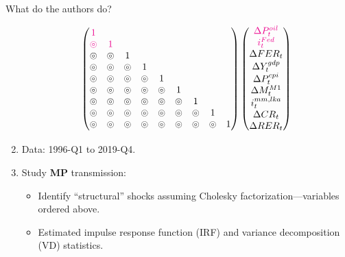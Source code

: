 \documentclass[10pt,english,slidetop,compress,
              blue,mathserif,color=option]{beamer}
\def\cc{\circledcirc}
\theoremstyle{plain}
\theoremstyle{definition}
\begin{document}
\begin{frame}{What do the authors do?}
\begin{enumerate}
      \begin{equation*}
        \begin{pmatrix}
          {\color{magenta}1}   & & & & & & & &
          \\
          {\color{magenta}\cc} & {\color{magenta}1} & & & & & & &
          \\
          \cc & \cc & 1 & & & & & &
          \\
          \cc & \cc & \cc & 1 & & & & & 
          \\
          \cc & \cc & \cc & \cc & 1 & & & & 
          \\
          \cc & \cc & \cc & \cc & \cc & 1 & & & 
          \\
          \cc & \cc & \cc & \cc & \cc & \cc & 1 & &
          \\
          \cc & \cc & \cc & \cc & \cc & \cc & \cc & 1 &
          \\
          \cc & \cc & \cc & \cc & \cc & \cc & \cc & \cc & 1
        \end{pmatrix}
        \begin{pmatrix}
          {\color{magenta}\Delta P_{t}^{oil}}
        \\ 
        {\color{magenta}i_{t}^{Fed}}
        \\
        \Delta FER_{t}
        \\
        \Delta Y_{t}^{gdp}
        \\
        \Delta P_{t}^{cpi} 
        \\
        \Delta M_{t}^{M1} 
        \\
        i_{t}^{mm,lka} 
        \\
        \Delta CR_{t} 
        \\
        \Delta RER_{t}
        \end{pmatrix}  
      \end{equation*}
    \item Data: 1996-Q1 to 2019-Q4.
    \item Study \textbf{MP} transmission:
      \begin{itemize}
        \item Identify ``structural'' shocks assuming Cholesky factorization---variables ordered above.
        \item Estimated impulse response function (IRF) and variance decomposition (VD) statistics.
      \end{itemize}
  \end{enumerate}
\end{frame}
\end{document}
